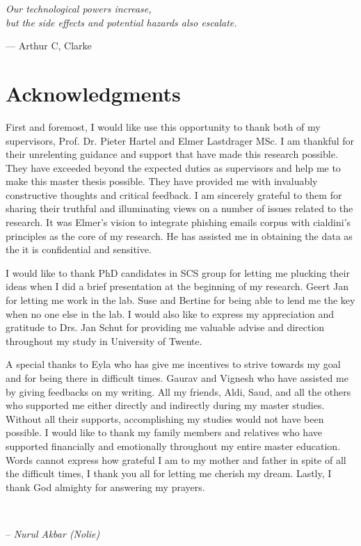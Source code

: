 
\begin{flushright}
\textsl{Our technological powers increase, }\\
\textsl{but the side effects and potential hazards also escalate.}\\

\par\end{flushright}

\begin{flushright}
\medskip{}
 --- Arthur C, Clarke
\par\end{flushright}

\bigskip{}


\begingroup
\let\clearpage\relax
\let\cleardoublepage\relax 


\chapter*{Acknowledgments}

First and foremost, I would like use this opportunity to thank both
of my supervisors, Prof. Dr. Pieter Hartel and Elmer Lastdrager MSc.
I am thankful for their unrelenting guidance and support that have
made this research possible. They have exceeded beyond the expected
duties as supervisors and help me to make this master thesis possible.
They have provided me with invaluably constructive thoughts and critical
feedback. I am sincerely grateful to them for sharing their truthful
and illuminating views on a number of issues related to the research.
It was Elmer's vision to integrate phishing emails corpus with cialdini's
principles as the core of my research. He has assisted me in obtaining
the data as the it is confidential and sensitive. 

I would like to thank PhD candidates in SCS group for letting me plucking
their ideas when I did a brief presentation at the beginning of my
research. Geert Jan for letting me work in the lab. Suse and Bertine
for being able to lend me the key when no one else in the lab. I would
also like to express my appreciation and gratitude to Drs. Jan Schut
for providing me valuable advise and direction throughout my study
in University of Twente. 

A special thanks to Eyla who has give me incentives to strive towards
my goal and for being there in difficult times. Gaurav and Vignesh
who have assisted me by giving feedbacks on my writing. All my friends,
Aldi, Saud, and all the others who supported me either directly and
indirectly during my master studies. Without all their supports, accomplishing
my studies would not have been possible. I would like to thank my
family members and relatives who have supported financially and emotionally
throughout my entire master education. Words cannot express how grateful
I am to my mother and father in spite of all the difficult times,
I thank you all for letting me cherish my dream. Lastly, I thank God
almighty for answering my prayers.

\ 

-- \textsl{Nurul Akbar (Nolie)}

\endgroup
